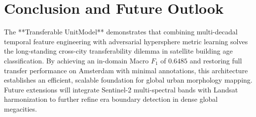 \documentclass[11pt,a4paper]{article}
\begin{document}
\section{Conclusion and Future Outlook}
The **Transferable UnitModel** demonstrates that combining multi-decadal temporal feature engineering with adversarial hypersphere metric learning solves the long-standing cross-city transferability dilemma in satellite building age classification. By achieving an in-domain Macro $F_1$ of $0.6485$ and restoring full transfer performance on Amsterdam with minimal annotations, this architecture establishes an efficient, scalable foundation for global urban morphology mapping. Future extensions will integrate Sentinel-2 multi-spectral bands with Landsat harmonization to further refine era boundary detection in dense global megacities.
\end{document}
